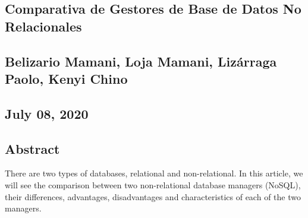 \documentclass[12pt]{article}
\begin{document}
\begin{adjustwidth}{0.56in}{0.57in}
\section*{Comparativa de Gestores de Base de Datos No Relacionales}
\end{adjustwidth}

\begin{adjustwidth}{0.56in}{0.57in}
\section*{Belizario Mamani, Loja Mamani, Lizárraga Paolo, Kenyi Chino}
\end{adjustwidth}

\begin{adjustwidth}{0.56in}{0.57in}
\section*{July 08, 2020}
\end{adjustwidth}

\begin{adjustwidth}{0.56in}{0.57in}
\subsection*{Abstract}
\end{adjustwidth}


\vspace{\baselineskip}
{\fontsize{10pt}{12.0pt}\selectfont There are two types of databases, relational and non-relational. In this article, we will see the comparison between two non-relational database managers (NoSQL), their differences, advantages, disadvantages and characteristics of each of the two managers.\par}\par


\vspace{\baselineskip}

\vspace{\baselineskip}
\end{document}
